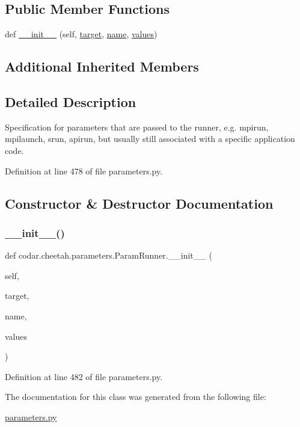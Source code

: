 \subsection*{Public Member Functions}
\begin{DoxyCompactItemize}
\item 
def \hyperlink{classcodar_1_1cheetah_1_1parameters_1_1_param_runner_aac032647089038378eedaa25c24775db}{\+\_\+\+\_\+init\+\_\+\+\_\+} (self, \hyperlink{classcodar_1_1cheetah_1_1parameters_1_1_param_a5603d43a20cfc6447c3718406ce0669e}{target}, \hyperlink{classcodar_1_1cheetah_1_1parameters_1_1_param_ac9982d62cd18a368a3fbc26541e14209}{name}, \hyperlink{classcodar_1_1cheetah_1_1parameters_1_1_param_aefcc82658f511bddd6605e6ac6e74fbf}{values})
\end{DoxyCompactItemize}
\subsection*{Additional Inherited Members}


\subsection{Detailed Description}
\begin{DoxyVerb}Specification for parameters that are passed to the runner, e.g.
mpirun, mpilaunch, srun, apirun, but usually still associated with a
specific application code.\end{DoxyVerb}
 

Definition at line 478 of file parameters.\+py.



\subsection{Constructor \& Destructor Documentation}
\mbox{\label{classcodar_1_1cheetah_1_1parameters_1_1_param_runner_aac032647089038378eedaa25c24775db}} 
\subsubsection{\texorpdfstring{\+\_\+\+\_\+init\+\_\+\+\_\+()}{\_\_init\_\_()}}
{\footnotesize\ttfamily def codar.\+cheetah.\+parameters.\+Param\+Runner.\+\_\+\+\_\+init\+\_\+\+\_\+ (\begin{DoxyParamCaption}\item[{}]{self,  }\item[{}]{target,  }\item[{}]{name,  }\item[{}]{values }\end{DoxyParamCaption})}



Definition at line 482 of file parameters.\+py.



The documentation for this class was generated from the following file\+:\begin{DoxyCompactItemize}
\item 
\hyperlink{parameters_8py}{parameters.\+py}\end{DoxyCompactItemize}
